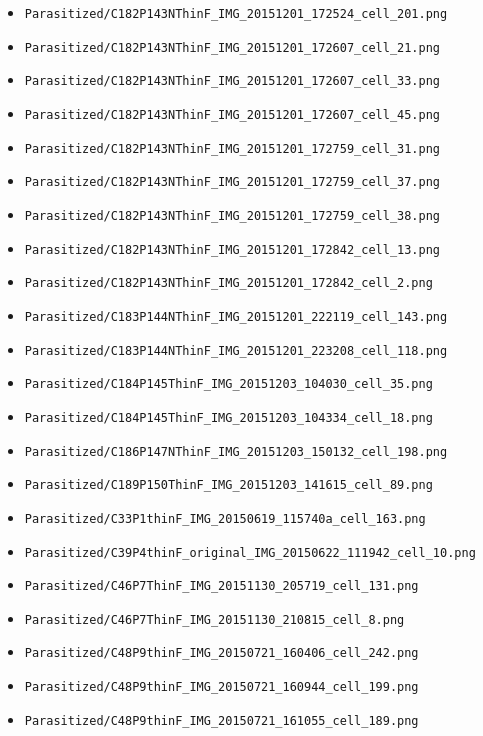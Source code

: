 \begin{itemize}
\item \texttt{Parasitized/C182P143NThinF\_IMG\_20151201\_172524\_cell\_201.png}
\item \texttt{Parasitized/C182P143NThinF\_IMG\_20151201\_172607\_cell\_21.png}
\item \texttt{Parasitized/C182P143NThinF\_IMG\_20151201\_172607\_cell\_33.png}
\item \texttt{Parasitized/C182P143NThinF\_IMG\_20151201\_172607\_cell\_45.png}
\item \texttt{Parasitized/C182P143NThinF\_IMG\_20151201\_172759\_cell\_31.png}
\item \texttt{Parasitized/C182P143NThinF\_IMG\_20151201\_172759\_cell\_37.png}
\item \texttt{Parasitized/C182P143NThinF\_IMG\_20151201\_172759\_cell\_38.png}
\item \texttt{Parasitized/C182P143NThinF\_IMG\_20151201\_172842\_cell\_13.png}
\item \texttt{Parasitized/C182P143NThinF\_IMG\_20151201\_172842\_cell\_2.png}
\item \texttt{Parasitized/C183P144NThinF\_IMG\_20151201\_222119\_cell\_143.png}
\item \texttt{Parasitized/C183P144NThinF\_IMG\_20151201\_223208\_cell\_118.png}
\item \texttt{Parasitized/C184P145ThinF\_IMG\_20151203\_104030\_cell\_35.png}
\item \texttt{Parasitized/C184P145ThinF\_IMG\_20151203\_104334\_cell\_18.png}
\item \texttt{Parasitized/C186P147NThinF\_IMG\_20151203\_150132\_cell\_198.png}
\item \texttt{Parasitized/C189P150ThinF\_IMG\_20151203\_141615\_cell\_89.png}
\item \texttt{Parasitized/C33P1thinF\_IMG\_20150619\_115740a\_cell\_163.png}
\item \texttt{Parasitized/C39P4thinF\_original\_IMG\_20150622\_111942\_cell\_10.png}
\item \texttt{Parasitized/C46P7ThinF\_IMG\_20151130\_205719\_cell\_131.png}
\item \texttt{Parasitized/C46P7ThinF\_IMG\_20151130\_210815\_cell\_8.png}
\item \texttt{Parasitized/C48P9thinF\_IMG\_20150721\_160406\_cell\_242.png}
\item \texttt{Parasitized/C48P9thinF\_IMG\_20150721\_160944\_cell\_199.png}
\item \texttt{Parasitized/C48P9thinF\_IMG\_20150721\_161055\_cell\_189.png}

\end{itemize}
